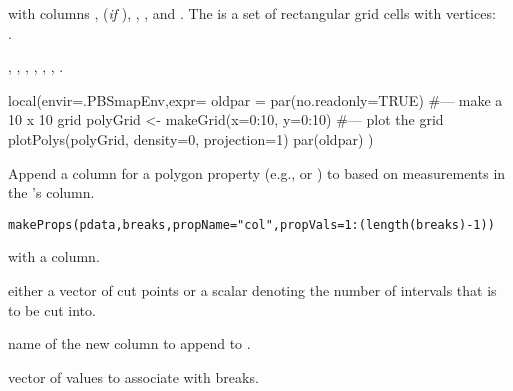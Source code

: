 \documentclass[letterpaper]{book}
\begin{document}
%
\begin{Value}
 with columns , 
(\emph{if} ), , , and .
The  is a set of rectangular grid cells with
vertices:\\{}
.
\end{Value}
%
\begin{SeeAlso}\relax
{},
,
,
,
,
,
.
\end{SeeAlso}
%
\begin{Examples}
\begin{ExampleCode}
local(envir=.PBSmapEnv,expr={
  oldpar = par(no.readonly=TRUE)
  #--- make a 10 x 10 grid
  polyGrid <- makeGrid(x=0:10, y=0:10)
  #--- plot the grid
  plotPolys(polyGrid, density=0, projection=1)
  par(oldpar)
})
\end{ExampleCode}
\end{Examples}
%
\begin{Description}\relax
Append a column for a polygon property (e.g.,  or
) to  based on measurements in the
's  column.
\end{Description}
%
\begin{Usage}
\begin{verbatim}
makeProps(pdata,breaks,propName="col",propVals=1:(length(breaks)-1))
\end{verbatim}
\end{Usage}
%
\begin{Arguments}
\begin{ldescription}
\item[\code{pdata}]  with a  column.
\item[\code{breaks}] either a vector of cut points or a scalar denoting the
number of intervals that  is to be cut into.
\item[\code{propName}] name of the new column to append to .
\item[\code{propVals}] vector of values to associate with  breaks.
\end{ldescription}
\end{Arguments}
\end{document}
